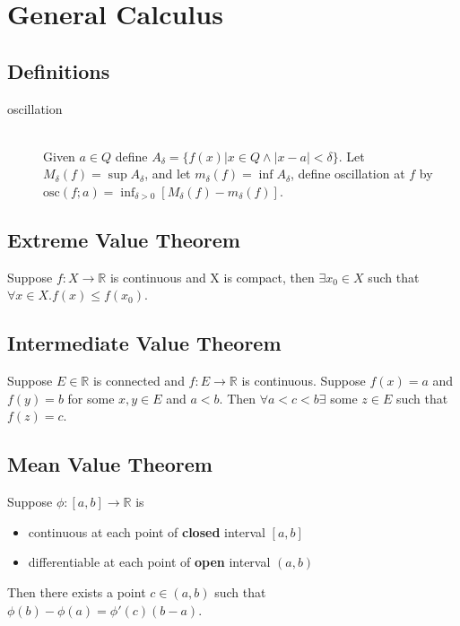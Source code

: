 \section{General Calculus}


\subsection{Definitions}
\begin{description}

\item[oscillation] \hfill \\
	Given $a\in Q$ define $A_\delta=\{f(x)|x\in Q \wedge |x-a|<\delta\}$.
	Let $M_\delta(f) = \sup A_\delta$, and let $m_\delta(f) = \inf A_\delta$,
	define oscillation at $f$ by $\mathrm{osc}(f;a)=\inf_{\delta>0}[M_\delta(f)-m_\delta(f)]$.

\end{description}

\subsection{Extreme Value Theorem}\label{thm:evt}
	Suppose $f:X \to \mathbb{R}$ is continuous and X is compact, \newline
	then $\exists x_0 \in X$ such that $\forall x \in X. f(x) \leq f(x_0)$.

\subsection{Intermediate Value Theorem}\label{thm:ivt}
	Suppose $E \in \mathbb{R}$ is connected and $f: E \to \mathbb{R}$ is continuous. \newline
	Suppose $f(x) = a$ and $f(y) = b$ for some $x, y \in E$ and $a < b$. \newline
	Then $\forall a < c < b \exists$ some $z \in E$ such that $f(z) = c$.

\subsection{Mean Value Theorem}\label{thm:mvt}
	Suppose $\phi:[a,b]\to\mathbb{R}$ is
	\begin{itemize}
		\item continuous at each point of \textbf{closed} interval $[a, b]$
		\item differentiable at each point of \textbf{open} interval $(a, b)$
	\end{itemize}
	Then there exists a point $c \in (a,b)$ such that $\phi(b)-\phi(a) = \phi'(c)(b-a)$.